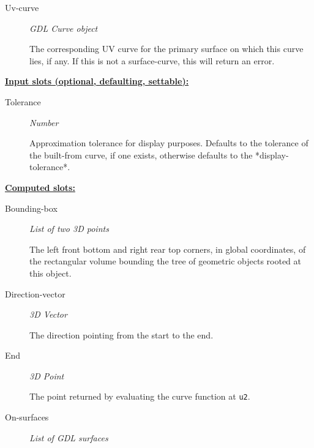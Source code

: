\documentclass [11pt]{book}
\begin{document}
\begin{itemize}
\begin{description}
\item [Uv-curve]
\emph{GDL Curve object}

 The corresponding UV curve for the primary surface on which this curve lies, if any. If
this is not a surface-curve, this will return an error.




\end{description}






\textbf{
\underline{Input slots (optional, defaulting, settable):}}

\begin{description}

\item [Tolerance]
\emph{Number}

 Approximation tolerance for display purposes. Defaults to the tolerance of the
built-from curve, if one exists, otherwise defaults to the *display-tolerance*.




\end{description}






\textbf{
\underline{Computed slots:}}

\begin{description}

\item [Bounding-box]
\emph{List of two 3D points}

 The left front bottom and right rear top corners, in global coordinates,
of the rectangular volume bounding the tree of geometric objects rooted at this object.




\item [Direction-vector]
\emph{3D Vector}

 The direction pointing from the start to the end.




\item [End]
\emph{3D Point}

 The point returned by evaluating the curve function at \texttt{u2}.




\item [On-surfaces]
\emph{List of GDL surfaces}


\end{description}
\end{itemize}
\end{document}
